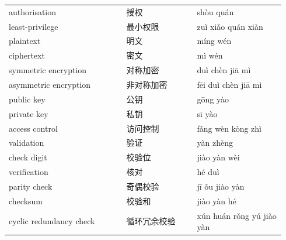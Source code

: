 \documentclass[11pt]{article}
\begin{document}
\begin{longtable}{@{}p{0.40\linewidth}p{0.24\linewidth}p{0.30\linewidth}@{}}
authorisation & 授权 & shòu quán \\
least-privilege & 最小权限 & zuì xiǎo quán xiàn \\
plaintext & 明文 & míng wén \\
ciphertext & 密文 & mì wén \\
symmetric encryption & 对称加密 & duì chèn jiā mì \\
asymmetric encryption & 非对称加密 & fēi duì chèn jiā mì \\
public key & 公钥 & gōng yào \\
private key & 私钥 & sī yào \\
access control & 访问控制 & fǎng wèn kòng zhì \\
validation & 验证 & yàn zhèng \\
check digit & 校验位 & jiào yàn wèi \\
verification & 核对 & hé duì \\
parity check & 奇偶校验 & jī ǒu jiào yàn \\
checksum & 校验和 & jiào yàn hé \\
cyclic redundancy check & 循环冗余校验 & xún huán rǒng yú jiào yàn \\
\end{longtable}
\end{document}
